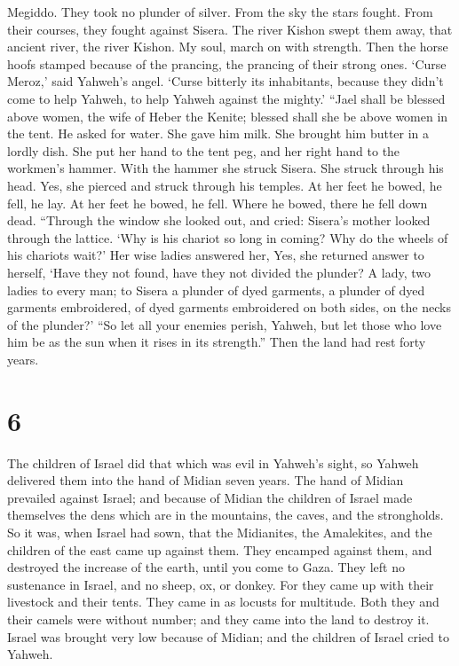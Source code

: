 Megiddo. They took no plunder of silver.  From the sky
the stars fought. From their courses, they fought against Sisera.
 The river Kishon swept them away, that ancient river,
the river Kishon. My soul, march on with strength.  Then
the horse hoofs stamped because of the prancing, the prancing of their
strong ones.  `Curse Meroz,' said Yahweh's angel. `Curse
bitterly its inhabitants, because they didn't come to help Yahweh, to
help Yahweh against the mighty.'  ``Jael shall be blessed
above women, the wife of Heber the Kenite; blessed shall she be above
women in the tent.  He asked for water. She gave him
milk. She brought him butter in a lordly dish.  She put
her hand to the tent peg, and her right hand to the workmen's hammer.
With the hammer she struck Sisera. She struck through his head. Yes, she
pierced and struck through his temples.  At her feet he
bowed, he fell, he lay. At her feet he bowed, he fell. Where he bowed,
there he fell down dead.  ``Through the window she looked
out, and cried: Sisera's mother looked through the lattice. `Why is his
chariot so long in coming? Why do the wheels of his chariots wait?'
 Her wise ladies answered her, Yes, she returned answer
to herself,  `Have they not found, have they not divided
the plunder? A lady, two ladies to every man; to Sisera a plunder of
dyed garments, a plunder of dyed garments embroidered, of dyed garments
embroidered on both sides, on the necks of the plunder?' 
``So let all your enemies perish, Yahweh, but let those who love him be
as the sun when it rises in its strength.'' Then the land had rest forty
years.

\hypertarget{section-5}{%
\section{6}\label{section-5}}

 The children of Israel did that which was evil in
Yahweh's sight, so Yahweh delivered them into the hand of Midian seven
years.  The hand of Midian prevailed against Israel; and
because of Midian the children of Israel made themselves the dens which
are in the mountains, the caves, and the strongholds.  So
it was, when Israel had sown, that the Midianites, the Amalekites, and
the children of the east came up against them.  They
encamped against them, and destroyed the increase of the earth, until
you come to Gaza. They left no sustenance in Israel, and no sheep, ox,
or donkey.  For they came up with their livestock and
their tents. They came in as locusts for multitude. Both they and their
camels were without number; and they came into the land to destroy it.
 Israel was brought very low because of Midian; and the
children of Israel cried to Yahweh.

